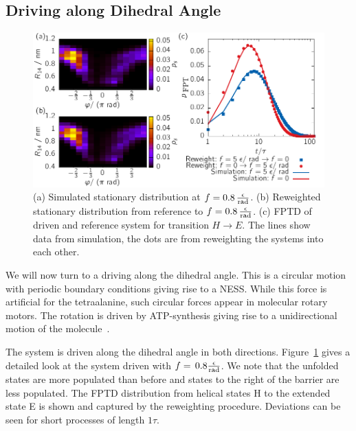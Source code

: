 \subsection{Driving along Dihedral Angle}
\label{sec:DrivingDAla}
\begin{figure}[h]
 \centering
 \includegraphics{../plots/Frew/single_2001.pdf}
 \caption[Stationary distribution and first-passage time distribution of a chosen process for tetraalanine peptide driven along the dihedral angle.]{(a) Simulated stationary distribution at $f = 0.8\,\frac{\epsilon}{\footnotesize{\text{rad}}}$. (b) Reweighted stationary distribution from reference to $f = 0.8\,\frac{\epsilon}{{\footnotesize \text{rad}}}$. (c) FPTD of driven and reference system for transition $H \rightarrow E$. The lines show data from simulation, the dots are from reweighting the systems into each other.}
 \label{fig:single2001}
\end{figure}



We will now turn to a driving along the dihedral angle. This is a circular motion with periodic boundary conditions giving rise to a NESS. While this force is artificial for the tetraalanine, such circular forces appear in molecular rotary motors. The rotation is driven by ATP-synthesis giving rise to a unidirectional motion of the molecule~\cite{fillingame1999molecular}.

The system is driven along the dihedral angle in both directions. Figure~\ref{fig:single2001} gives a detailed look at the system driven with $f =\,0.8 \frac{\epsilon}{{\footnotesize\text{rad}}}$. We note that the unfolded states are more populated than before and states to the right of the barrier are less populated. The FPTD distribution from helical states H to the extended state E is shown and captured by the reweighting procedure. Deviations can be seen for short processes of length  $1\tau$.  

